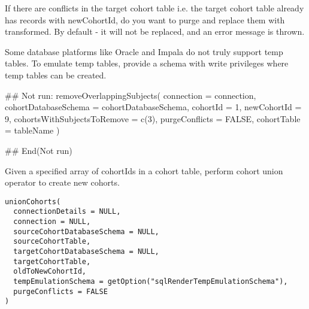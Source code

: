 \documentclass[a4paper]{book}
\begin{document}
\begin{Arguments}
\begin{ldescription}
\item[\code{purgeConflicts}] If there are conflicts in the target cohort table i.e. the target cohort table
already has records with newCohortId, do you want to purge and replace them
with transformed. By default - it will not be replaced, and an error message is thrown.

\item[\code{tempEmulationSchema}] Some database platforms like Oracle and Impala do not truly support
temp tables. To emulate temp tables, provide a schema with write
privileges where temp tables can be created.
\end{ldescription}
\end{Arguments}
%
\begin{Examples}
\begin{ExampleCode}
## Not run: 
removeOverlappingSubjects(
  connection = connection,
  cohortDatabaseSchema = cohortDatabaseSchema,
  cohortId = 1,
  newCohortId = 9,
  cohortsWithSubjectsToRemove = c(3),
  purgeConflicts = FALSE,
  cohortTable = tableName
)

## End(Not run)

\end{ExampleCode}
\end{Examples}
%
\begin{Description}\relax
Given a specified array of cohortIds in a cohort table, perform
cohort union operator to create new cohorts.

\strong{[Stable]}
\end{Description}
%
\begin{Usage}
\begin{verbatim}
unionCohorts(
  connectionDetails = NULL,
  connection = NULL,
  sourceCohortDatabaseSchema = NULL,
  sourceCohortTable,
  targetCohortDatabaseSchema = NULL,
  targetCohortTable,
  oldToNewCohortId,
  tempEmulationSchema = getOption("sqlRenderTempEmulationSchema"),
  purgeConflicts = FALSE
)
\end{verbatim}
\end{Usage}
%
\end{document}
